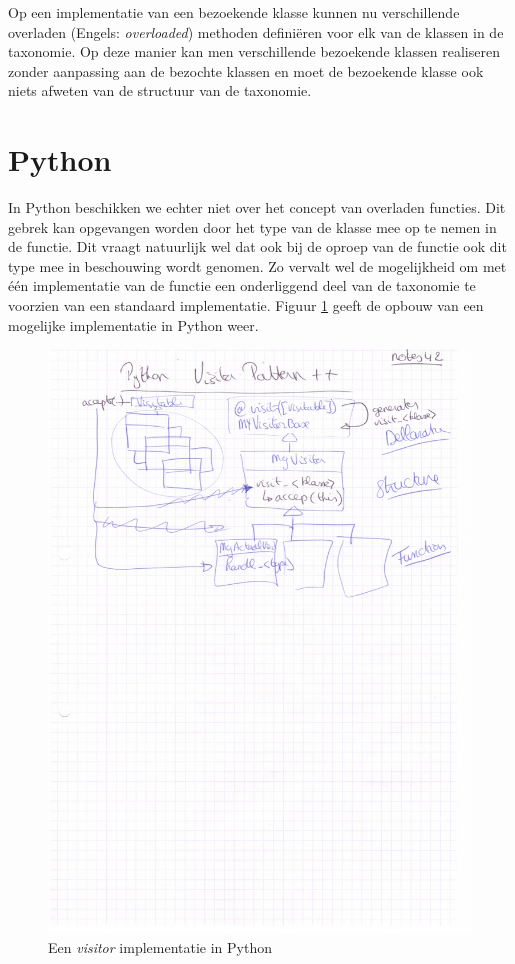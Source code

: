 Op een implementatie van een bezoekende klasse kunnen nu verschillende
overladen (Engels: \emph{overloaded}) methoden defini\"eren voor elk van de
klassen in de taxonomie. Op deze manier kan men verschillende bezoekende
klassen realiseren zonder aanpassing aan de bezochte klassen en moet de
bezoekende klasse ook niets afweten van de structuur van de taxonomie.

\section{Python}

In Python beschikken we echter niet over het concept van overladen functies.
Dit gebrek kan opgevangen worden door het type van de klasse mee op te nemen in
de  functie. Dit vraagt natuurlijk wel dat ook bij de oproep van de
 functie ook dit type mee in beschouwing wordt genomen. Zo
vervalt wel de mogelijkheid om met \'e\'en implementatie van de functie een
onderliggend deel van de taxonomie te voorzien van een standaard implementatie.
Figuur \ref{fig:py-visitor} geeft de opbouw van een mogelijke implementatie in
Python weer.

\begin{figure}[ht]
  \centering
  \includegraphics[width=0.77\linewidth]{resources/py-visitor.pdf}
  \caption{Een \emph{visitor} implementatie in Python}
  \label{fig:py-visitor}
\end{figure}

